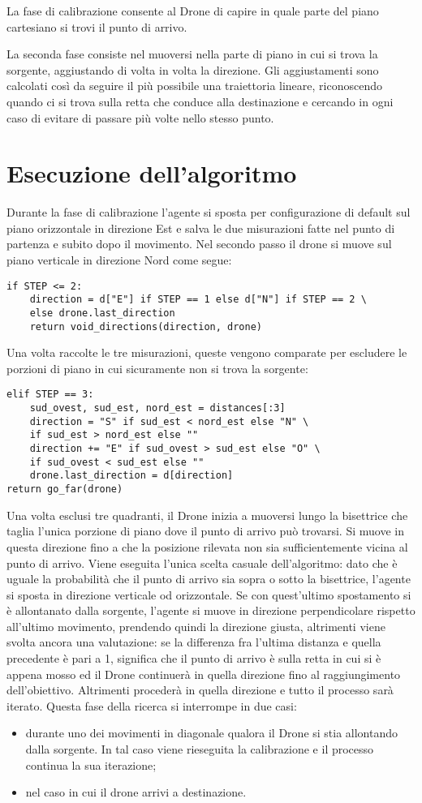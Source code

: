 La fase di calibrazione consente al Drone di capire in quale parte del piano cartesiano si trovi il punto di arrivo. 

La seconda fase consiste nel muoversi nella parte di piano in cui si trova la sorgente, aggiustando di volta in volta la direzione. Gli aggiustamenti sono calcolati così da seguire il più possibile una traiettoria lineare, riconoscendo quando ci si trova sulla retta che conduce alla destinazione e cercando in ogni caso di evitare di passare più volte nello stesso punto.
	
\section{Esecuzione dell'algoritmo}
Durante la fase di calibrazione l'agente si sposta per configurazione di default sul piano orizzontale in direzione Est e salva le due misurazioni fatte nel punto di partenza e subito dopo il movimento. Nel secondo passo il drone si muove sul piano verticale in direzione Nord come segue: 
\begin{verbatim}
if STEP <= 2:
    direction = d["E"] if STEP == 1 else d["N"] if STEP == 2 \
    else drone.last_direction
    return void_directions(direction, drone)
\end{verbatim}
Una volta raccolte le tre misurazioni, queste vengono comparate per escludere le porzioni di piano in cui sicuramente non si trova la sorgente:
\begin{verbatim}
elif STEP == 3:
    sud_ovest, sud_est, nord_est = distances[:3]
    direction = "S" if sud_est < nord_est else "N" \
    if sud_est > nord_est else ""
    direction += "E" if sud_ovest > sud_est else "O" \
    if sud_ovest < sud_est else ""
    drone.last_direction = d[direction]
return go_far(drone)
\end{verbatim}

Una volta esclusi tre quadranti, il Drone inizia a muoversi lungo la bisettrice che taglia l'unica porzione di piano dove il punto di arrivo può trovarsi. Si muove in questa direzione fino a che la posizione rilevata non sia sufficientemente vicina al punto di arrivo. Viene eseguita l'unica scelta casuale dell'algoritmo: dato che è uguale la probabilità che il punto di arrivo sia sopra o sotto la bisettrice, l'agente si sposta in direzione verticale od orizzontale. Se con quest'ultimo spostamento si è allontanato dalla sorgente, l'agente si muove in direzione perpendicolare rispetto all'ultimo movimento, prendendo quindi la direzione giusta, altrimenti viene svolta ancora una valutazione: se la differenza fra l'ultima distanza e quella precedente è pari a 1, significa che il punto di arrivo è sulla retta in cui si è appena mosso ed il Drone continuerà in quella direzione fino al raggiungimento dell'obiettivo. Altrimenti procederà in quella direzione e tutto il processo sarà iterato. Questa fase della ricerca si interrompe in due casi: 

\begin{itemize}
\item durante uno dei movimenti in diagonale qualora il Drone si stia allontando dalla sorgente. In tal caso viene rieseguita la calibrazione e il processo continua la sua iterazione;

\item nel caso in cui il drone arrivi a destinazione.
\end{itemize}